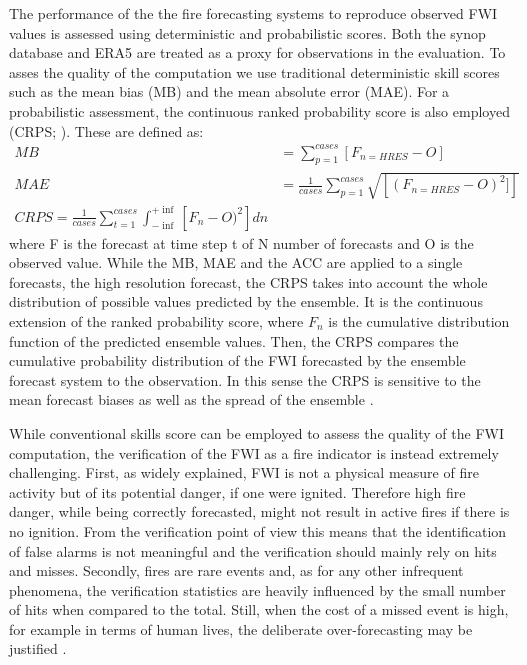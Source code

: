 \documentclass[, manuscript]{copernicus}
\begin{document}
The performance of the the fire forecasting systems to reproduce
observed FWI values is assessed using deterministic and probabilistic
scores. Both the synop database and ERA5 are treated as a proxy for
observations in the evaluation. To asses the quality of the computation
we use traditional deterministic skill scores such as the mean bias (MB)
and the mean absolute error (MAE). For a probabilistic assessment, the
continuous ranked probability score is also employed (CRPS;
\cite{hersbach2000}). These are defined as: \begin{align}
MB&=\sum_{p=1}^{cases}\left[F_{n=HRES}-O\right]\\
MAE&=\frac{1}{cases}\sum_{p=1}^{cases}\sqrt{\left[(F_{n=HRES}-O)^2]\right]}\\
CRPS=\frac{1}{cases}\sum_{t=1}^{cases}\int_{-\inf}^{+\inf}\left[F_{n}-O)^2\right]dn
\end{align} where F is the forecast at time step t of N number of
forecasts and O is the observed value. While the MB, MAE and the ACC are
applied to a single forecasts, the high resolution forecast, the CRPS
takes into account the whole distribution of possible values predicted
by the ensemble. It is the continuous extension of the ranked
probability score, where \(F_n\) is the cumulative distribution function
of the predicted ensemble values. Then, the CRPS compares the cumulative
probability distribution of the FWI forecasted by the ensemble forecast
system to the observation. In this sense the CRPS is sensitive to the
mean forecast biases as well as the spread of the ensemble
\citep{hersbach2000}.

While conventional skills score can be employed to assess the quality of
the FWI computation, the verification of the FWI as a fire indicator is
instead extremely challenging. First, as widely explained, FWI is not a
physical measure of fire activity but of its potential danger, if one
were ignited. Therefore high fire danger, while being correctly
forecasted, might not result in active fires if there is no ignition.
From the verification point of view this means that the identification
of false alarms is not meaningful and the verification should mainly
rely on hits and misses. Secondly, fires are rare events and, as for any
other infrequent phenomena, the verification statistics are heavily
influenced by the small number of hits when compared to the total.
Still, when the cost of a missed event is high, for example in terms of
human lives, the deliberate over-forecasting may be justified
\citep{richardson:00,cloke:17}.
\end{document}
